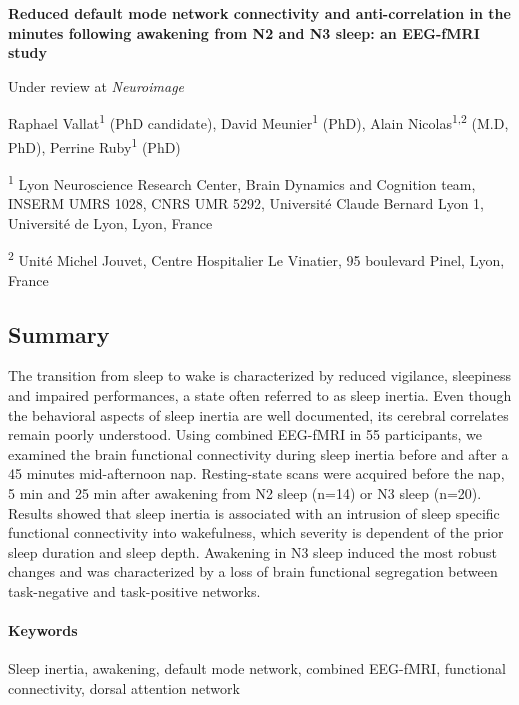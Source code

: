\cleardoublepage
\textbf{{\large Reduced default mode network connectivity and anti-correlation in the minutes following awakening from N2 and N3 sleep: an EEG-fMRI study}}

\hfill Under review at \emph{Neuroimage}

\bigskip

Raphael Vallat\textsuperscript{1} (PhD candidate), David Meunier\textsuperscript{1} (PhD), Alain Nicolas\textsuperscript{1,2} (M.D, PhD), Perrine Ruby\textsuperscript{1} (PhD)

\textsuperscript{1} Lyon Neuroscience Research Center, Brain Dynamics and Cognition team, INSERM UMRS 1028, CNRS UMR 5292, Université Claude Bernard Lyon 1, Université de Lyon, Lyon, France

\textsuperscript{2} Unité Michel Jouvet, Centre Hospitalier Le Vinatier, 95 boulevard Pinel, Lyon, France

\subsection*{Summary}
\label{res:inertia:inertia:summary}

The transition from sleep to wake is characterized by reduced vigilance, sleepiness and impaired performances, a state often referred to as sleep inertia. Even though the behavioral aspects of sleep inertia are well documented, its cerebral correlates remain poorly understood. Using combined EEG-fMRI in 55 participants, we examined the brain functional connectivity during sleep inertia before and after a 45 minutes mid-afternoon nap. Resting-state scans were acquired before the nap, 5 min and 25 min after awakening from N2 sleep (n=14) or N3 sleep (n=20). Results showed that sleep inertia is associated with an intrusion of sleep specific functional connectivity into wakefulness, which severity is dependent of the prior sleep duration and sleep depth. Awakening in N3 sleep induced the most robust changes and was characterized by a loss of brain functional segregation between task-negative and task-positive networks.

\paragraph{Keywords}
Sleep inertia, awakening, default mode network, combined EEG-fMRI, functional connectivity, dorsal attention network


